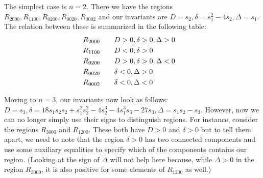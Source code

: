 \documentclass{amsart}
\theoremstyle{definition}
\theoremstyle{remark}
\numberwithin{equation}{section}
\begin{document}
The simplest case is $n=2$.  There we have the regions $R_{2000},
R_{1100}, R_{0200}, R_{0020}, R_{0002}$ and our invariants are $D =
s_2, \delta = s_1^2 - 4s_2, \Delta = s_1$.  The relation between these
is summarized in the following table:
\begin{align}
R_{2000} \qquad &D > 0, \delta > 0, \Delta > 0 \cr
R_{1100} \qquad &D < 0, \delta > 0 \cr
R_{0200} \qquad &D > 0, \delta > 0, \Delta < 0 \cr
R_{0020} \qquad &\delta < 0, \Delta > 0 \cr
R_{0002} \qquad &\delta < 0, \Delta < 0 \cr
\end{align}

Moving to $n=3$, our invariants now look as follows: $D = s_3, \delta
= 18 s_1 s_2 s_2 + s_1^2 s_2^2 - 4 s_2^3 - 4 s_1^3 s_3 - 27 s_3,
\Delta = s_1 s_2 - s_3$.  However, now we can no longer simply use their
signs to distinguish regions.  For instance, consider the regions
$R_{3000}$ and $R_{1200}$.  These both have $D > 0$ and $\delta > 0$
but to tell them apart, we need to note that the region $\delta > 0$
has two connected components and use some auxiliary equalities to
specify which of the components contains our region.  (Looking at the
sign of $\Delta$ will not help here because, while $\Delta > 0$ in the
region $R_{3000}$, it is also positive for some elements of $R_{1200}$
as well.)







\end{document}

